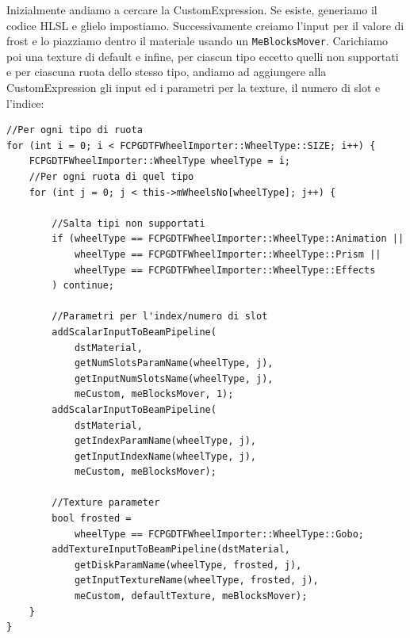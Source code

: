 \documentclass[main.tex]{subfiles}
\begin{document}
\clearpage
Inizialmente andiamo a cercare la CustomExpression. Se esiste, generiamo il codice HLSL e glielo impostiamo. Successivamente creiamo l'input per il valore di frost e lo piazziamo dentro il materiale usando un \lstinline{MeBlocksMover}.
%    
Carichiamo poi una texture di default e infine, per ciascun tipo eccetto quelli non supportati e per ciascuna ruota dello stesso tipo, andiamo ad aggiungere alla CustomExpression gli input ed i parametri per la texture, il numero di slot e l'indice:
\begin{lstlisting}
//Per ogni tipo di ruota
for (int i = 0; i < FCPGDTFWheelImporter::WheelType::SIZE; i++) {
    FCPGDTFWheelImporter::WheelType wheelType = i;
    //Per ogni ruota di quel tipo
    for (int j = 0; j < this->mWheelsNo[wheelType]; j++) {

        //Salta tipi non supportati
        if (wheelType == FCPGDTFWheelImporter::WheelType::Animation ||
            wheelType == FCPGDTFWheelImporter::WheelType::Prism ||
            wheelType == FCPGDTFWheelImporter::WheelType::Effects
        ) continue;

        //Parametri per l'index/numero di slot
        addScalarInputToBeamPipeline(
            dstMaterial,
            getNumSlotsParamName(wheelType, j),
            getInputNumSlotsName(wheelType, j),
            meCustom, meBlocksMover, 1);
        addScalarInputToBeamPipeline(
            dstMaterial,
            getIndexParamName(wheelType, j),
            getInputIndexName(wheelType, j),
            meCustom, meBlocksMover);

        //Texture parameter
        bool frosted =
            wheelType == FCPGDTFWheelImporter::WheelType::Gobo;
        addTextureInputToBeamPipeline(dstMaterial,
            getDiskParamName(wheelType, frosted, j),
            getInputTextureName(wheelType, frosted, j),
            meCustom, defaultTexture, meBlocksMover);
    }
}
\end{lstlisting}
\end{document}
